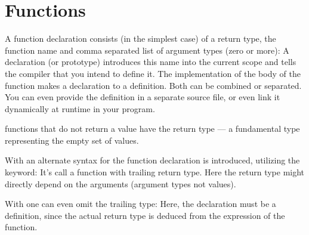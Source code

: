 \section{Functions\label{sec:function}}
A function declaration consists (in the simplest case) of a return type, the function name and comma separated list of argument types (zero or more):
%
%
A declaration (or prototype) introduces this name into the current scope and tells the compiler that you intend to define it. The
implementation of the body of the function makes a declaration to a definition. Both can be combined or separated. You can even provide
the definition in a separate source file, or even link it dynamically at runtime in your program.

functions that do not return a value have the return type  --- a fundamental type representing the empty set of values.

\begin{rem}
  With \marginpar{[\cxx{11}]} an alternate syntax for the function declaration is introduced, utilizing the  keyword:
  It's call a function with trailing return type. Here the return type might directly depend on the arguments (argument types not values).

  With \marginpar{[\cxx{14}]} one can even omit the trailing type:
  Here, the declaration must be a definition, since the actual return type is deduced from the  expression of the function.
\end{rem}

